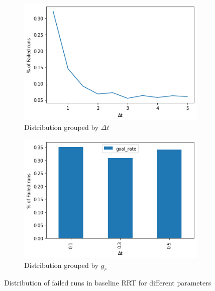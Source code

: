 \documentclass[a4paper,12pt]{article}
\DeclareRobustCommand{\[}{\begin{equation}}
\DeclareRobustCommand{\]}{\end{equation}}
\numberwithin{equation}{section}
\numberwithin{algorithm}{section}
\begin{document}
\begin{figure}[H]
\centering
    \begin{subfigure}[b]{0.6\textwidth}
        \includegraphics[scale=0.6,width=\textwidth]{images/baseline_failure_dist.png}
        \caption{Distribution grouped by $\Delta{t}$}
        \label{fig:baseline_edge_len_fail_dist}
    \end{subfigure}
    \begin{subfigure}[b]{0.6\textwidth}
        \includegraphics[scale=0.6,width=\textwidth]{images/baseline_failure_dist_grate.png}
        \caption{Distribution grouped by $g_r$}
    \end{subfigure}
    \caption{Distribution of failed runs in baseline RRT for different parameters}
\end{figure}
\end{document}
